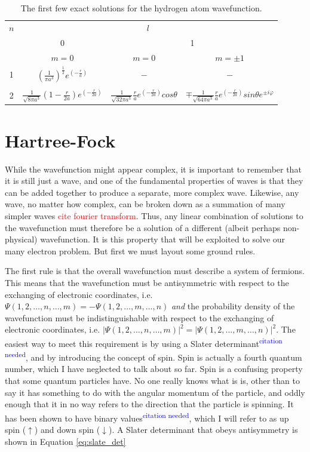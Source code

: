 \documentclass[12pt]{report}
\newcommand{\notetodylan}[1]{\textcolor{red}{#1}} %
\newcommand{\citethis}{\textsuperscript{\textcolor{blue}{citation needed}}} %
\begin{document}
\begin{table}[h!]
\caption{The first few exact solutions for the hydrogen atom wavefunction.}
\label{tab:hsol}
\centering
\begin{tabular}{cccc}
\toprule
$n$	&	\multicolumn{3}{c}{$l$}	\\
\cmidrule(lr){1-1} \cmidrule(lr){2-4}
				&	0		&	\multicolumn{2}{c}{1}	\\ 
					\cmidrule(lr){2-2} \cmidrule(lr){3-4}
				&	$m=0$	&	$m=0$	&	$m=\pm1$	\\
\midrule
1	&	$\displaystyle\left(\frac{1}{\pi a^{3}}\right)^{\frac{1}{2}}e^{\left(-\frac{r}{a}\right)}$			&	$-$	&	$-$	\\
\\
2	&	$\displaystyle\frac{1}{\sqrt{8\pi a^{3}}}\left(1-\frac{r}{2a}\right)e^{\left(-\frac{r}{2a}\right)}$	&	$\displaystyle\frac{1}{\sqrt{32\pi a^{3}}}\frac{r}{a}e^{\left(-\frac{r}{2a}\right)}cos\theta $	&	
$\displaystyle\mp\frac{1}{\sqrt{64\pi a^{3}}}\frac{r}{a}e^{\left(-\frac{r}{2a}\right)}sin\theta e^{\pm i \varphi}$	\\
\bottomrule
\end{tabular}
\end{table}

\section{Hartree-Fock}
\label{sec:hartree_fock}
While the wavefunction might appear complex, it is important to remember that it is still just a wave, and one of the fundamental properties of waves is that they can be added together to produce a separate, more complex wave. Likewise, any wave, no matter how complex, can be broken down as a summation of many simpler waves \notetodylan{cite fourier transform}. Thus, any linear combination of solutions to the wavefunction must therefore be a solution of a different (albeit perhaps non-physical) wavefunction. It is this property that will be exploited to solve our many electron problem. But first we must layout some ground rules.

The first rule is that the overall wavefunction must describe a system of fermions. This means that the wavefunction must be antisymmetric with respect to the exchanging of electronic coordinates, i.e. $\Psi(1, 2,\ldots, n,\ldots,m) = -\Psi(1, 2,\ldots, m,\ldots,n)$ \textit{and} the probability density of the wavefunction must be indistinguishable with respect to the exchanging of electronic coordinates, i.e. $|\Psi(1, 2,\ldots, n,\ldots,m)|^{2} = |\Psi(1, 2,\ldots, m,\ldots,n)|^{2}$. The easiest way to meet this requirement is by using a Slater determinant\citethis, and by introducing the concept of spin. Spin is actually a fourth quantum number, which I have neglected to talk about so far. Spin is a confusing property that some quantum particles have. No one really knows what is is, other than to say it has something to do with the angular momentum of the particle, and oddly enough that it in no way refers to the direction that the particle is spinning. It has been shown to have binary values\citethis, which I will refer to as up spin ($\uparrow$) and down spin ($\downarrow$). A Slater determinant that obeys antisymmetry is shown in Equation \ref{eq:slate_det}
\end{document}

